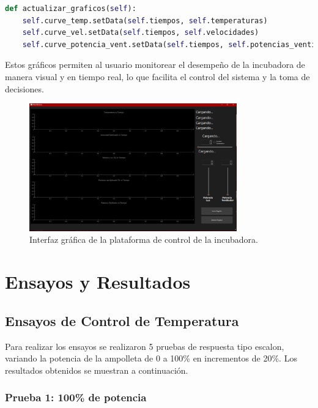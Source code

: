 \documentclass[spanish, a4paper, 11pt]{article}
\begin{document}
\begin{lstlisting}[language=Python]
def actualizar_graficos(self):
    self.curve_temp.setData(self.tiempos, self.temperaturas)
    self.curve_vel.setData(self.tiempos, self.velocidades)
    self.curve_potencia_vent.setData(self.tiempos, self.potencias_ventilador)
\end{lstlisting}

Estos gráficos permiten al usuario monitorear el desempeño de la incubadora de manera visual y en tiempo real, lo que facilita el control del sistema y la toma de decisiones.

\begin{figure}[ht]
    \centering
    \includegraphics[width=0.8\textwidth]{./figures/Interfaz.png}
    \caption{Interfaz gráfica de la plataforma de control de la incubadora.}
\end{figure}
\FloatBarrier



\section{Ensayos y Resultados}

\subsection{Ensayos de Control de Temperatura}

Para realizar los ensayos se realizaron 5 pruebas de respuesta tipo escalon, variando la potencia de la ampolleta de 0 a 100\% en incrementos de 20\%. Los resultados obtenidos se muestran a continuación.

\newpage
\subsubsection{Prueba 1: 100\% de potencia}
\end{document}
